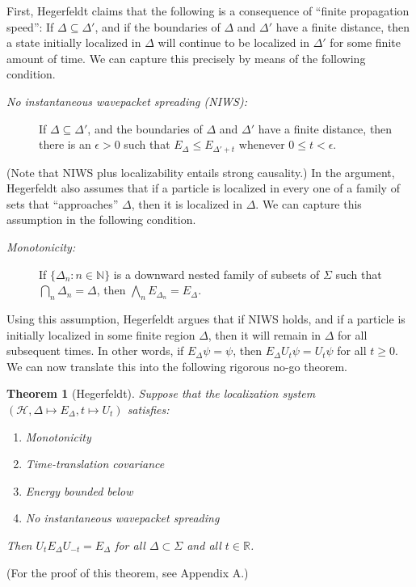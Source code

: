 \documentclass[12pt]{article}
\newtheorem*{thm*}{Theorem}
\theoremstyle{remark}
\newcommand{\hil}[1]{\mathcal{#1}}
\begin{document}
First, Hegerfeldt claims that the following is a consequence of
``finite propagation speed'': If $\Delta \subseteq \Delta '$, and if
the boundaries of $\Delta$ and $\Delta '$ have a finite distance, then
a state initially localized in $\Delta$ will continue to be localized
in $\Delta '$ for some finite amount of time.  We can capture this
precisely by means of the following condition.
\begin{description} 
\item[{\it No instantaneous wavepacket spreading (NIWS):}] If $\Delta
  \subseteq \Delta '$, and the boundaries of $\Delta$ and $\Delta '$
  have a finite distance, then there is an $\epsilon >0$ such that
  $E_{\Delta}\leq E_{\Delta '+t}$ whenever $0\leq t < \epsilon$.
\end{description} 
(Note that NIWS plus localizability entails strong causality.)  In the
argument, Hegerfeldt also assumes that if a particle is localized in
every one of a family of sets that ``approaches'' $\Delta$, then it is
localized in $\Delta$.  We can capture this assumption in the
following condition.
\begin{description}
\item[{\it Monotonicity:}] If $\{ \Delta _{n}:n \in \mathbb{N} \}$ is
  a downward nested family of subsets of $\Sigma$ such that $\bigcap
  _{n}\Delta _{n} =\Delta$, then $\bigwedge _{n}E_{\Delta
    _{n}}=E_{\Delta}$.  \end{description} Using this assumption,
Hegerfeldt argues that if NIWS holds, and if a particle is initially
localized in some finite region $\Delta$, then it will remain in
$\Delta$ for all subsequent times.  In other words, if $E_{\Delta}\psi
=\psi$, then $E_{\Delta}U_{t}\psi =U_{t}\psi$ for all $t\geq 0$.  We
can now translate this into the following rigorous no-go theorem.
\begin{thm*}[Hegerfeldt] Suppose that the localization system $(\hil{H},\Delta
  \mapsto E_{\Delta},t\mapsto U_{t})$ satisfies:
\begin{enumerate}
\item Monotonicity
\item Time-translation covariance
\item Energy bounded below
\item No instantaneous wavepacket spreading 
\end{enumerate}
Then $U_{t}E_{\Delta}U_{-t}=E_{\Delta}$ for all $\Delta \subset
\Sigma$ and all $t\in \mathbb{R}$. \label{reconstruct}
\end{thm*}
\noindent (For the proof of this theorem, see Appendix A.)  
\end{document}
